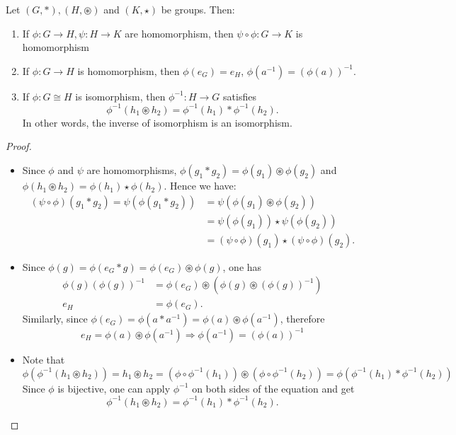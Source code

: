 \begin{proposition} \label{prop:gphomomproperty}
Let $(G, \ast), (H, \circledast)$ and $(K, \star)$ be groups. Then:
\begin{enumerate}
    \item[(a)] If $\phi : G \to H, \psi : H \to K$ are homomorphism, then $\psi \circ \phi : G \to K$ is homomorphism
    \item[(b)] If $\phi : G \to H$ is homomorphism, then $\phi(e_G) = e_H$, $\phi(a^{-1}) = (\phi(a))^{-1}$.
    \item[(c)] If $\phi : G \cong H$ is isomorphism, then $\phi^{-1} : H \to G$ satisfies 
    $$\phi^{-1}(h_1 \circledast h_2) = \phi^{-1}(h_1) \ast \phi^{-1}(h_2).$$ 
    In other words, the inverse of isomorphism is an isomorphism.
\end{enumerate}
\end{proposition}
\begin{proof} 
\begin{itemize}
    \item[(a)] Since $\phi$ and $\psi$ are homomorphisms, $\phi(g_1 * g_2) = \phi(g_1) \circledast \phi(g_2)$ and $\phi(h_1 \circledast h_2) = \phi(h_1) \star \phi(h_2)$. Hence we have:
    \begin{align*}
        (\psi \circ \phi)(g_1 * g_2) = \psi(\phi(g_1 * g_2)) &= \psi(\phi(g_1) \circledast \phi(g_2))\\ 
        &= \psi(\phi(g_1)) \star \psi(\phi(g_2))\\
        &= (\psi \circ \phi)(g_1) \star (\psi \circ \phi)(g_2). 
    \end{align*}

\item[(b)] Since
$\phi(g) = \phi(e_G * g) = \phi(e_G) \circledast \phi(g)$, one has
\begin{align*} \phi(g)(\phi(g))^{-1} &= \phi(e_G) \circledast (\phi(g) \circledast (\phi(g))^{-1}) \\
e_H &= \phi(e_G). \end{align*}
Similarly, since
$\phi(e_G) = \phi(a * a^{-1}) = \phi(a) \circledast \phi(a^{-1})$, therefore 
$$e_H = \phi(a) \circledast \phi(a^{-1}) \Rightarrow \phi(a^{-1}) = (\phi(a))^{-1}$$

\item[(c)] Note that 
$$\phi(\phi^{-1}(h_1 \circledast h_2)) = h_1 \circledast h_2 = (\phi \circ \phi^{-1}(h_1)) \circledast (\phi \circ \phi^{-1}(h_2)) = \phi(\phi^{-1}(h_1) * \phi^{-1}(h_2))$$
Since $\phi$ is bijective, one can apply $\phi^{-1}$ on both sides of the equation and get
$$\phi^{-1}(h_1 \circledast h_2) = \phi^{-1}(h_1) * \phi^{-1}(h_2).$$
\end{itemize}
\end{proof}

